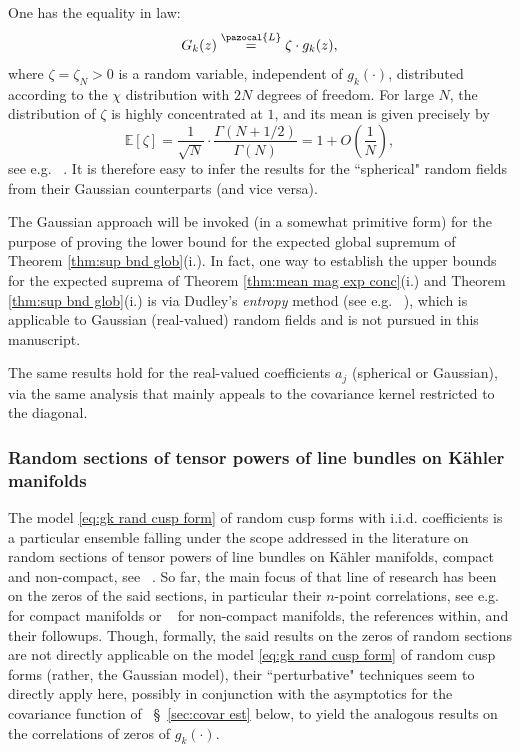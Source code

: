 \documentclass[12pt, a4paper]{amsart}
\theoremstyle{definition}
\newcommand {\E} {\mathbb{E}}
\newcommand {\1} {\mathbf{1}}
\newcommand {\Lc} {\pazocal {L}}
\numberwithin{equation}{section}
\begin{document}
One has the equality in law:
\begin{equation}
\label{eq:G_{k}=zeta gk}
G_{k}(z)\stackrel{\Lc}{=}\zeta \cdot g_{k}(z),
\end{equation}
where $\zeta=\zeta_{N}>0$ is a random variable, independent of $g_{k}(\cdot)$, 
distributed according to the $\chi$ distribution with $2N$ degrees of freedom. For large $N$, the distribution of $\zeta$ is highly concentrated at $1$, and
its mean is given precisely by
\begin{equation}
\label{eq:mean zeta}
\E[\zeta] = \frac{1}{\sqrt{N}}\cdot\frac{\Gamma(N+1/2)}{\Gamma(N)}=1+O\left(\frac{1}{N}\right),
\end{equation}
see e.g. ~\cite[p. 238]{Stats with Math}. It is therefore easy to infer the results for the ``spherical" random fields from their Gaussian counterparts (and vice versa). 

\vspace{2mm}

The Gaussian approach will be invoked (in a somewhat primitive form) for the purpose of proving the lower bound for the expected global supremum of Theorem \ref{thm:sup bnd glob}(i.).
In fact, one way to establish the upper bounds for the expected suprema of Theorem \ref{thm:mean mag exp conc}(i.) 
and Theorem \ref{thm:sup bnd glob}(i.) is via Dudley's {\em entropy} method
(see e.g. ~\cite[\S 1.3]{AdTa}), which is applicable to Gaussian (real-valued) random fields and is not pursued in this manuscript.

\vspace{2mm}

The same results hold for the real-valued coefficients $a_{j}$ (spherical or Gaussian), via the same analysis that mainly appeals to the covariance kernel restricted to the diagonal.


\subsubsection{{\bf Random sections of tensor powers of line bundles on K\"{a}hler manifolds}}

The model \eqref{eq:gk rand cusp form} of random cusp forms with i.i.d. coefficients
is a particular ensemble falling under the scope addressed in the literature on random sections of tensor powers of line bundles
on K\"{a}hler manifolds, compact and non-compact, see ~\cite[\S~4]{DrLiMar sup}. So far, the main focus of that line of research has been on the zeros of the said sections, in particular their $n$-point correlations,
see e.g. ~\cite{BlShZe Inv,ShZe GAFA} for compact manifolds or ~\cite{MaMar Adv,DrLiMar Gauss,DrLiMar sup} for non-compact manifolds, the references within, and their followups.
Though, formally, the said results on the zeros of random sections are not directly applicable on the model \eqref{eq:gk rand cusp form} of random cusp forms (rather, the Gaussian model),
their ``perturbative" techniques seem to directly apply here, possibly in conjunction with the asymptotics for the covariance function of ~\S~\ref{sec:covar est} below, to yield the analogous results on the correlations of zeros of
$g_{k}(\cdot)$.
\end{document}
